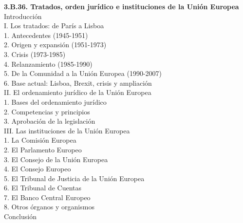 \documentclass[11pt]{article}
\begin{document}
\begin{esquema}[unbreakable]
\textbf{3.B.36. Tratados, orden jurídico e instituciones de la Unión Europea}\\[2pt]
Introducción\\
I. Los tratados: de París a Lisboa\\
\hspace*{1.5em}1. Antecedentes (1945-1951)\\
\hspace*{1.5em}2. Origen y expansión (1951-1973)\\
\hspace*{1.5em}3. Crisis (1973-1985)\\
\hspace*{1.5em}4. Relanzamiento (1985-1990)\\
\hspace*{1.5em}5. De la Comunidad a la Unión Europea (1990-2007)\\
\hspace*{1.5em}6. Base actual: Lisboa, Brexit, crisis y ampliación\\
II. El ordenamiento jurídico de la Unión Europea\\
\hspace*{1.5em}1. Bases del ordenamiento jurídico\\
\hspace*{1.5em}2. Competencias y principios\\
\hspace*{1.5em}3. Aprobación de la legislación\\
III. Las instituciones de la Unión Europea\\
\hspace*{1.5em}1. La Comisión Europea\\
\hspace*{1.5em}2. El Parlamento Europeo\\
\hspace*{1.5em}3. El Consejo de la Unión Europea\\
\hspace*{1.5em}4. El Consejo Europeo\\
\hspace*{1.5em}5. El Tribunal de Justicia de la Unión Europea\\
\hspace*{1.5em}6. El Tribunal de Cuentas\\
\hspace*{1.5em}7. El Banco Central Europeo\\
\hspace*{1.5em}8. Otros órganos y organismos\\
Conclusión
\end{esquema}
\end{document}
